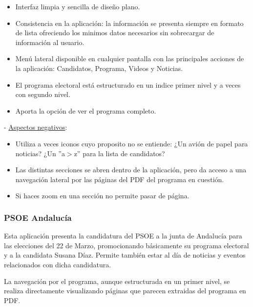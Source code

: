 \begin{itemize}
	\item Interfaz limpia y sencilla de diseño plano.
	\item Consistencia en la aplicación: la información se presenta siempre en formato de lista ofreciendo los minimos datos necesarios sin sobrecargar de información al usuario.
	\item Menú lateral disponible en cualquier pantalla con las principales acciones de la aplicación: Candidatos, Programa, Videos y Noticias.
	\item El programa electoral está estructurado en un indice primer nivel y a veces con segundo nivel.
	\item Aporta la opción de ver el programa completo. 
\end{itemize}

 - \underline{Aspectos negativos}:

\begin{itemize}
	\item Utiliza a veces iconos cuyo proposito no se entiende: ¿Un avión de papel para noticias? ¿Un ''a$>$z'' para la lista de candidatos?
	\item Las distintas secciones se abren dentro de la aplicación, pero da acceso a una navegación lateral por las páginas del PDF del programa en cuestión.
	\item Si haces zoom en una sección no permite pasar de página.
\end{itemize}

\subsubsection{PSOE Andalucía}

Esta aplicación \cite{ref:psoeAnd}  presenta la candidatura del PSOE a la junta de Andalucía para las elecciones del 22 de Marzo, promocionando básicamente su programa electoral y a la candidata Susana Díaz. Permite también estar al día de noticias y eventos relacionados con dicha candidatura.

La navegación por el programa, aunque estructurada en un primer nivel, se realiza directamente visualizando páginas que parecen extraidas del programa en PDF.

